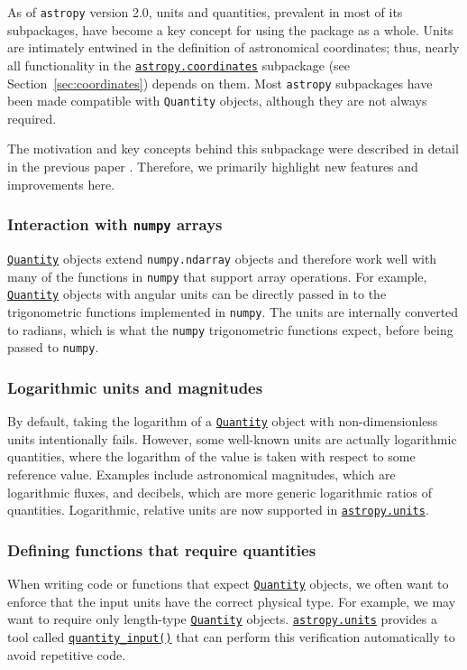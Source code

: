\documentclass[modern]{aastex62}
\newcommand{\package}[1]{\texttt{#1}\xspace}
\newcommand{\astropypkg}{\package{astropy}}
\newcommand{\sectionname}{Section\xspace}
\newcommand{\astropysubpkg}[1]{\href{http://docs.astropy.org/en/stable/#1/index.html}{\texttt{astropy.#1}}\xspace}
\newcommand{\astropyQuantity}{\href{http://docs.astropy.org/en/stable/api/astropy.units.Quantity.html}{\texttt{Quantity}}\xspace}
\begin{document}
As of \astropypkg version 2.0, units and quantities, prevalent in most of its
subpackages, have become a key concept for using the package as a whole.
Units are intimately entwined in the definition of astronomical coordinates;
thus, nearly all functionality in the \astropysubpkg{coordinates} subpackage
(see \sectionname~\ref{sec:coordinates}) depends on them.
Most \astropypkg subpackages have been made compatible with \texttt{Quantity} 
objects, although they are not always required. 

The motivation and key concepts behind this subpackage were described in detail
in the previous paper \citep{astropy}. Therefore, we primarily highlight new
features and improvements here.

\subsubsection{Interaction with \package{numpy} arrays}

\astropyQuantity objects extend
\texttt{numpy.ndarray} objects and therefore
work well with many of the functions in \texttt{numpy} that support
array operations. For example, \astropyQuantity objects with angular
units can be directly passed in to the trigonometric functions implemented in
\texttt{numpy}. The units are internally converted to radians, which is what
the \texttt{numpy} trigonometric functions expect, before being passed to
\texttt{numpy}.

\subsubsection{Logarithmic units and magnitudes}
        By default, taking the logarithm of
        a \astropyQuantity object with non-dimensionless units intentionally
        fails.
        However, some well-known units are actually logarithmic quantities,
        where the logarithm of the value is taken with respect to some reference
        value.
        Examples include astronomical magnitudes, which are logarithmic fluxes,
        and decibels, which are more generic logarithmic ratios of quantities.
        Logarithmic, relative units are now supported in \astropysubpkg{units}.

\subsubsection{Defining functions that require quantities}
        When writing code or
        functions that expect \astropyQuantity objects, we often want to
        enforce that the input units have the correct physical type.
        For example, we may want to require only length-type \astropyQuantity
        objects.
        \astropysubpkg{units} provides a tool called \href{http://docs.astropy.org/en/stable/api/astropy.units.quantity_input.html}{\texttt{quantity\_input()}}
        that can perform this verification automatically to avoid repetitive
        code.
\end{document}
